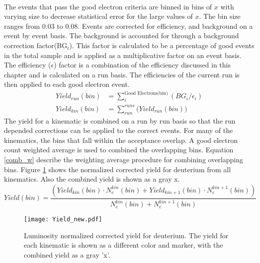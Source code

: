 \paragraph{}The events that pass the good electron criteria are binned in bins of $x$ with varying size to decrease statistical error for the large values of $x$. The bin size ranges from 0.03 to 0.08. Events are corrected for efficiency, and background on a event by event basis. The background is accounted for through a background correction factor(BG$_i$). This factor is calculated to be a percentage of good events in the total sample and is applied as a multiplicative factor on an event basis. The efficiency ($\epsilon$) factor is a combination of the efficiency discussed in this chapter and is calculated on a run basis. The efficiencies of the current run is then applied to each good electron event. 
\begin{align}
Yield_{run}(bin) &= \sum_{i}^{\text{Good Electrons(bin)} } \left( BG_{i}/\epsilon_{i} \right) \nonumber\\
Yield_{kin}(bin) &= \sum_{run}^{runs} \bigg( Yield_{run}(bin) \bigg)
\end{align}
The yield for a kinematic is combined on a run by run basis so that the run depended corrections can be applied to the correct events. For many of the kinematics, the bins that fall within the acceptance overlap. A good electron count weighted average is used to combined the overlapping bins. Equation \ref{comb_w} describe the weighting average procedure for combining overlapping bins. Figure \ref{kinYield} shows the normalized corrected yield for deuterium from all kinematics. Also the combined yield is shown as a gray x. 
\begin{equation}
Yield(bin) = \frac{\left( Yield_{kin}(bin)\cdot N_e^{kin}(bin)+ Yield_{kin+1}(bin)\cdot N_e^{kin+1}(bin) \right)}{N_e^{kin}(bin)+N_e^{kin+1}(bin)} \label{comb_w}
\end{equation}
\begin{figure}
	\caption{Luminosity normalized corrected yield for deuterium. The yield for each kinematic is shown as a different color and marker, with the combined yield as a gray 'x'.  \label{kinYield}}
	\texttt{[image: Yield\_new.pdf]}
\end{figure}
		
